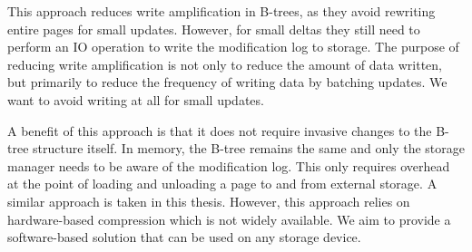 This approach reduces write amplification in B-trees, as they avoid rewriting entire pages for small updates.
However, for small deltas they still need to perform an \ac{IO} operation to write the modification log to storage.
The purpose of reducing write amplification is not only to reduce the amount of data written, but primarily to reduce the frequency of writing data by batching updates.
We want to avoid writing at all for small updates.

A benefit of this approach is that it does not require invasive changes to the B-tree structure itself.
In memory, the B-tree remains the same and only the storage manager needs to be aware of the modification log.
This only requires overhead at the point of loading and unloading a page to and from external storage.
A similar approach is taken in this thesis.
However, this approach relies on hardware-based compression which is not widely available.
We aim to provide a software-based solution that can be used on any storage device.

    